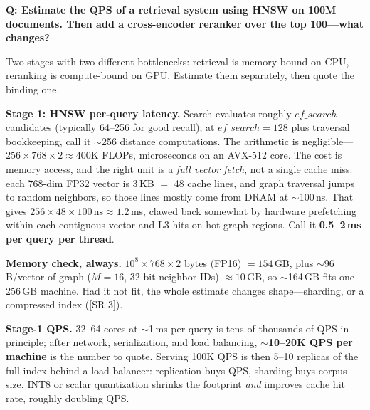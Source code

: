 \begin{interviewq}
\end{interviewq}


\begin{interviewq}
\textbf{Q: Estimate the QPS of a retrieval system using HNSW on 100M documents. Then add a cross-encoder reranker over the top 100---what changes?}

 \quad {} \quad \badgefreq{\freqmed}

\stronganswer

Two stages with two different bottlenecks: retrieval is memory-bound on CPU, reranking is compute-bound on GPU. Estimate them separately, then quote the binding one.

\textbf{Stage 1: HNSW per-query latency.} Search evaluates roughly $ef\_search$ candidates (typically 64--256 for good recall); at $ef\_search = 128$ plus traversal bookkeeping, call it $\sim$256 distance computations. The arithmetic is negligible---$256 \times 768 \times 2 \approx 400$K FLOPs, microseconds on an AVX-512 core. The cost is memory access, and the right unit is a \textit{full vector fetch}, not a single cache miss: each 768-dim FP32 vector is 3\,KB $=$ 48 cache lines, and graph traversal jumps to random neighbors, so those lines mostly come from DRAM at $\sim$100\,ns. That gives $256 \times 48 \times 100\,\mathrm{ns} \approx 1.2$\,ms, clawed back somewhat by hardware prefetching within each contiguous vector and L3 hits on hot graph regions. Call it \textbf{0.5--2\,ms per query per thread}.

\textbf{Memory check, always.} $10^8 \times 768 \times 2$ bytes (FP16) $= 154$\,GB, plus $\sim$96\,B/vector of graph ($M = 16$, 32-bit neighbor IDs) $\approx 10$\,GB, so $\sim$164\,GB fits one 256\,GB machine. Had it not fit, the whole estimate changes shape---sharding, or a compressed index ([SR 3]).

\textbf{Stage-1 QPS.} 32--64 cores at $\sim$1\,ms per query is tens of thousands of QPS in principle; after network, serialization, and load balancing, \textbf{$\sim$10--20K QPS per machine} is the number to quote. Serving 100K QPS is then 5--10 replicas of the full index behind a load balancer: replication buys QPS, sharding buys corpus size. INT8 or scalar quantization shrinks the footprint \textit{and} improves cache hit rate, roughly doubling QPS.


\end{interviewq}
